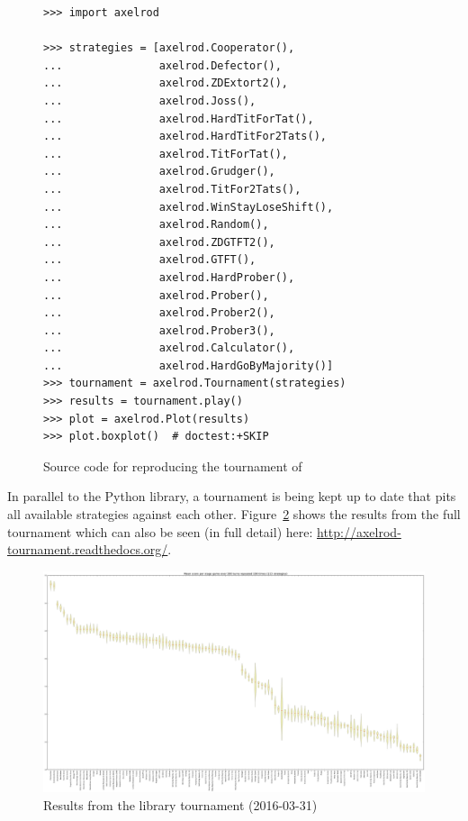 \documentclass{article}
\begin{document}
\begin{figure}[!hbtp]
    \begin{verbatim}
>>> import axelrod

>>> strategies = [axelrod.Cooperator(),
...               axelrod.Defector(),
...               axelrod.ZDExtort2(),
...               axelrod.Joss(),
...               axelrod.HardTitForTat(),
...               axelrod.HardTitFor2Tats(),
...               axelrod.TitForTat(),
...               axelrod.Grudger(),
...               axelrod.TitFor2Tats(),
...               axelrod.WinStayLoseShift(),
...               axelrod.Random(),
...               axelrod.ZDGTFT2(),
...               axelrod.GTFT(),
...               axelrod.HardProber(),
...               axelrod.Prober(),
...               axelrod.Prober2(),
...               axelrod.Prober3(),
...               axelrod.Calculator(),
...               axelrod.HardGoByMajority()]
>>> tournament = axelrod.Tournament(strategies)
>>> results = tournament.play()
>>> plot = axelrod.Plot(results)
>>> plot.boxplot()  # doctest:+SKIP
    \end{verbatim}
    \caption{Source code for reproducing the tournament of \cite{Stewart2012}}
    \label{fig:stewart-code}
\end{figure}

In parallel to the Python library, a tournament is being kept up to date that
pits all available strategies against each other. Figure~\ref{fig:tournament}
shows the results from the full tournament which can also be seen (in full
detail) here: \url{http://axelrod-tournament.readthedocs.org/}.

\begin{figure}[!hbtp]
	\centering
	\includegraphics[width=.9\textwidth]{../img/tournament.pdf}
	\caption{Results from the library tournament (2016-03-31)}
	\label{fig:tournament}
\end{figure}
\end{document}
